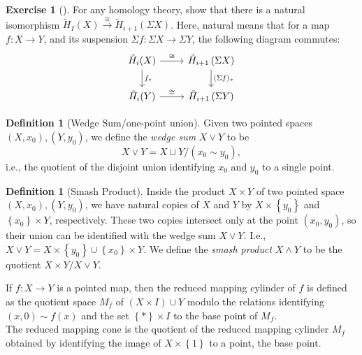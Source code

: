 \documentclass[reqno]{amsart}
\theoremstyle{definition}
\newtheorem{definition}[theorem]{Definition}
\newtheorem{exercise}[theorem]{Exercise}
\theoremstyle{remark}
\begin{document}
\begin{exercise}[]
    For any homology theory, show that
    there is a natural isomorphism
    $\tilde{H}_I (X) \stackrel{\cong}{\to} 
    \tilde{H}_{i+1} \left( \Sigma X \right) $. Here,
    natural means that for a map $f \colon X \to Y$,
    and its suspension $\Sigma f \colon \Sigma X \to 
    \Sigma Y$, the following diagram commutes:
    \begin{equation*}
    \begin{tikzcd}
        \tilde{H}_i (X) \ar[r, "\cong"] \ar[d, "f_*"]& 
        \tilde{H}_{i+1} \left( \Sigma X \right)
        \ar[d, "(\Sigma f)_*"] \\
        \tilde{H}_i (Y) \ar[r, "\cong"] & \tilde{H}_{i+1}
        \left( \Sigma Y \right) 
    \end{tikzcd}
    \end{equation*}
    
\end{exercise}


\begin{definition}[Wedge Sum/one-point union]
    Given two pointed spaces $(X, x_0), \left( Y, y_0 \right) $,
    we define
    the \textit{wedge sum}  $X \vee Y$ to be
    \[
    X \vee Y = X \sqcup Y / \left( x_0 \sim y_0 \right) ,
    \] 
    i.e., the quotient of the disjoint union identifying
    $x_0$ and $y_0$ to a single point.
\end{definition}

\begin{definition}[Smash Product]
    Inside the product $X \times Y$
    of two pointed space $(X,x_0), (Y,y_0)$,
    we have natural copies of $X$ and $Y$ by
    $X \times \left\{ y_0 \right\} $ and
    $\left\{ x_0 \right\} \times Y$, respectively.
    These two copies intersect only at the point
    $\left( x_0,y_0 \right) $, so their union can
    be identified with
    the wedge sum $X \vee Y$. I.e., $X \vee Y = 
    X \times \left\{ y_0 \right\} \cup 
    \left\{ x_0 \right\} \times Y$. We define
    the \textit{smash product} $X \wedge Y$ to be
    the quotient $X \times Y / X \vee Y$.
\end{definition}


If $f \colon X \to Y$ is a pointed map, then
the reduced mapping cylinder of $f$ is defined
as the quotient space $M_f$ of
$\left( X \times I \right) \cup  Y$ modulo the relations
identifying
$\left( x,0 \right) \sim f(x)$ and the set
$\left\{ * \right\} \times I$ to the base point of $M_f$.\\
The reduced mapping cone is the quotient of the reduced
mapping cylinder $M_f$ obtained by identifying the image of
$X \times \left\{ 1 \right\} $ to a point, the
base point.\\
\end{document}
